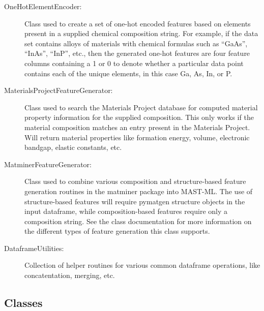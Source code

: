 \documentclass[letterpaper,10pt,english]{sphinxmanual}
\begin{document}
\begin{description}
\item[{OneHotElementEncoder:}] \leavevmode
Class used to create a set of one-hot encoded features based on elements present in a supplied chemical composition string.
For example, if the data set contains alloys of materials with chemical formulas such as “GaAs”, “InAs”, “InP”, etc.,
then the generated one-hot features are four feature columns containing a 1 or 0 to denote whether a particular data
point contains each of the unique elements, in this case Ga, As, In, or P.

\item[{MaterialsProjectFeatureGenerator:}] \leavevmode
Class used to search the Materials Project database for computed material property information for the
supplied composition. This only works if the material composition matches an entry present in the Materials Project.
Will return material properties like formation energy, volume, electronic bandgap, elastic constants, etc.

\item[{MatminerFeatureGenerator:}] \leavevmode
Class used to combine various composition and structure-based feature generation routines in the matminer package
into MAST-ML. The use of structure-based features will require pymatgen structure objects in the input
dataframe, while composition-based features require only a composition string. See the class documentation
for more information on the different types of feature generation this class supports.

\item[{DataframeUtilities:}] \leavevmode
Collection of helper routines for various common dataframe operations, like concatentation, merging, etc.

\end{description}


\subsection{Classes}
\label{\detokenize{5_feature_generators:classes}}
\end{document}
